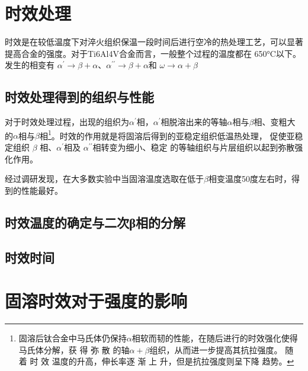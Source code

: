 \documentclass[
class = book,
zihao = -4,
font = noto,
paper = a4paper,
openany
]{easybook}
\newcommand{\ti}{Ti6Al4V}
\begin{document}
\chapter{时效处理}
时效是在较低温度下对淬火组织保温一段时间后进行空冷的热处理工艺，可以显著提高合金的强度。对于\ti 合金而言，一般整个过程的温度都在 650°C以下。发生的相变有 $ \alpha  ^{\prime}\to \beta+\alpha$、$ \alpha  ^{\prime\prime}\to\beta+\alpha$和 $\omega\to \alpha+\beta$
\section{时效处理得到的组织与性能}

对于时效处理过程，出现的组织为$ \alpha  ^{\prime}$相，$ \alpha  ^{\prime}$相脱溶出来的等轴$ \alpha$相与$ \beta $相、变粗大的$ \alpha $相与$ \beta $相\footnote{固溶后钛合金中马氏体仍保持$ \alpha $相软而韧的性能，在随后进行的时效强化使得马氏体分解，获 得 弥 散 的轴$ \alpha+\beta $组织，从而进一步提高其抗拉强度。 随 着 时 效 温度的升高，伸长率逐 渐 上 升，但是抗拉强度则呈下降 趋势。}。\cite{zhanghaoyinGurongShixiaoduiTC4taihejinzuzhihelixuexingnengdeyingxiang2014}时效的作用就是将固溶后得到的亚稳定组织低温热处理， 促使亚稳定组织 $\beta$ 相、$ \alpha  ^{\prime}$相及 $ \alpha  ^{\prime\prime}$相转变为细小、稳定 的等轴组织与片层组织以起到弥散强化作用。


经过调研发现，在大多数实验中当固溶温度选取在低于$ \beta $相变温度50度左右时，得到的性能最好。

\section{时效温度的确定与二次β相的分解}


\section{时效时间}


\chapter{固溶时效对于强度的影响}
\end{document}
